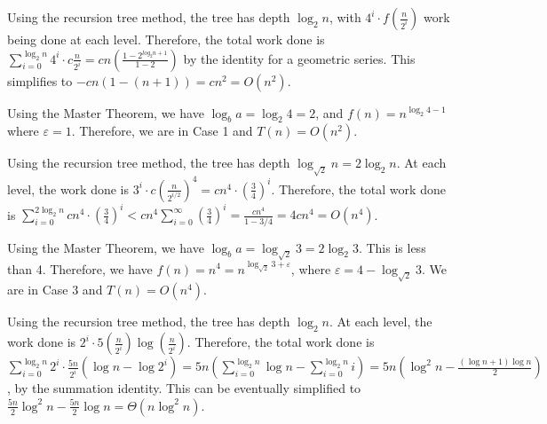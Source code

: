 \documentclass[12pt,twoside]{article}
\begin{document}


\begin{problems}

\problem  %

\begin{problemparts}
\problempart %
Using the recursion tree method, the tree has depth \(\log_2 n\), with \(4^i \cdot f(\frac{n}{2^i})\) work being done at each level. Therefore, the total work done is \(\sum_{i=0}^{\log_2 n} 4^i \cdot c \frac{n}{2^i} = cn\left(\frac{1-2^{log_2 n + 1}}{1-2}\right)\) by the identity for a geometric series. This simplifies to \(-cn(1-(n+1))=cn^2=O(n^2)\).

Using the Master Theorem, we have \(\log_b a = \log_2 4 = 2\), and \(f(n) = n^{\log_2 4 - 1}\) where \(\varepsilon=1\). Therefore, we are in Case 1 and \(T(n) = O(n^2)\).

\problempart %
Using the recursion tree method, the tree has depth \(\log_{\sqrt{2}}n=2\log_2 n\). At each level, the work done is \(3^i \cdot c\left(\frac{n}{2^{i/2}}\right)^4=cn^4 \cdot \left(\frac{3}{4}\right)^i\). Therefore, the total work done is \(\sum_{i=0}^{2\log_2 n} cn^4 \cdot \left(\frac{3}{4}\right)^i < cn^4 \sum_{i=0}^\infty \left(\frac{3}{4}\right)^i=\frac{cn^4}{1-3/4}=4cn^4=O(n^4)\). 

Using the Master Theorem, we have \(\log_b a = \log_{\sqrt{2}} 3 = 2\log_2 3\). This is less than 4. Therefore, we have \(f(n)=n^4 = n^{\log_{\sqrt{2}} 3 + \varepsilon}\), where \(\varepsilon=4-\log_{\sqrt{2}}3\). We are in Case 3 and \(T(n)=O(n^4)\).

\problempart %
Using the recursion tree method, the tree has depth \(\log_2 n\). At each level, the work done is \(2^i \cdot 5\left(\frac{n}{2^i}\right) \log \left(\frac{n}{2^i}\right)\). Therefore, the total work done is \(\sum_{i=0}^{\log_2n} 2^i \cdot \frac{5n}{2^i} (\log n - \log 2^i)=5n\left(\sum_{i=0}^{\log_2n}\log n - \sum_{i=0}^{\log_2n}i\right)=5n\left(\log^2n-\frac{(\log n + 1)\log n}{2}\right)\), by the summation identity. This can be eventually simplified to \(\frac{5n}{2}\log^2n-\frac{5n}{2}\log n = \Theta(n\log^2 n)\).


\end{problemparts}
\end{problems}
\end{document}
